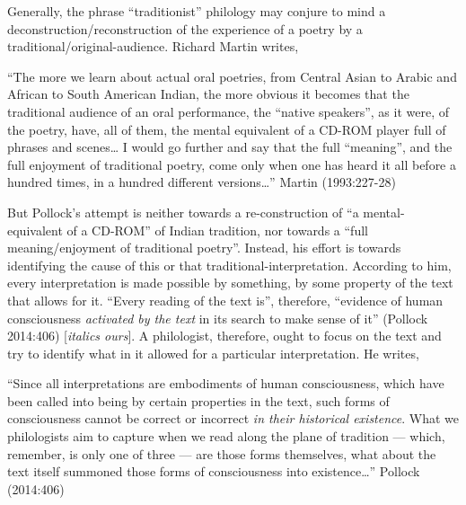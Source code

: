 Generally, the phrase “traditionist” philology may conjure to mind a deconstruction/reconstruction of the experience of a poetry by a traditional/original-audience. Richard Martin writes,

\begin{myquote}
“The more we learn about actual oral poetries, from Central Asian to Arabic and African to South American Indian, the more obvious it becomes that the traditional audience of an oral performance, the “native speakers”, as it were, of the poetry, have, all of them, the mental equivalent of a CD-ROM player full of phrases and scenes… I would go further and say that the full “meaning”, and the full enjoyment of traditional poetry, come only when one has heard it all before a hundred times, in a hundred different versions…” 	
\hfill Martin (1993:227-28)
\end{myquote}

But Pollock’s attempt is neither towards a re-construction of “a mental-equivalent of a CD-ROM” of Indian tradition, nor towards a “full meaning/enjoyment of traditional poetry”. Instead, his effort is towards identifying the cause of this or that traditional-interpretation. According to him, every interpretation is made possible by something, by some property of the text that allows for it. “Every reading of the text is”, therefore, “evidence of human consciousness {\sl activated by the text} in its search to make sense of it” (Pollock 2014:406) [{\sl italics ours}]. A philologist, therefore, ought to focus on the text and try to identify what in it allowed for a particular interpretation. He writes,

\begin{myquote}
“Since all interpretations are embodiments of human consciousness, which have been called into being by certain properties in the text, such forms of consciousness cannot be correct or incorrect {\sl in their historical existence}. What we philologists aim to capture when we read along the plane of tradition --- which, remember, is only one of three --- are those forms themselves, what about the text itself summoned those forms of consciousness into existence…”
\hfill Pollock (2014:406)
\end{myquote}

